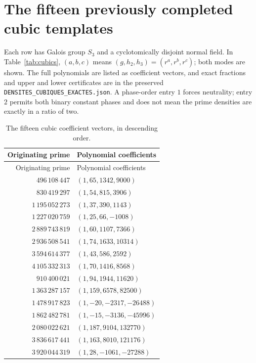 \documentclass[11pt]{article}
\theoremstyle{definition}\newtheorem{definition}[theorem]{Definition}
\begin{document}
\clearpage
\section{The fifteen previously completed cubic templates}\label{app:cubics}
Each row has Galois group $S_3$ and a cyclotomically disjoint
normal field. In Table~\ref{tab:cubics}, $(a,b,c)$ means
$(g,h_2,h_3)=(r^a,r^b,r^c)$; both modes are shown. The full
polynomials are listed as coefficient vectors, and exact fractions
and upper and lower certificates are in the preserved
\texttt{DENSITES\_CUBIQUES\_EXACTES.json}. A phase-order entry
$1$ forces neutrality; entry $2$ permits both binary constant
phases and does not mean the prime densities are exactly in a
ratio of two.
\begin{center}\small\setlength{\tabcolsep}{4pt}
\begin{longtable}{rl}
\caption{The fifteen cubic coefficient vectors, in descending order.}\label{tab:cubicpoly}\\
\toprule
Originating prime & Polynomial coefficients \\
\midrule\endfirsthead
\toprule
Originating prime & Polynomial coefficients \\
\midrule\endhead
$496\,108\,447$ & $(1,65,1342,9000)$ \\
$830\,419\,297$ & $(1,54,815,3906)$ \\
$1\,195\,052\,273$ & $(1,37,390,1143)$ \\
$1\,227\,020\,759$ & $(1,25,66,-1008)$ \\
$2\,889\,743\,819$ & $(1,60,1107,7366)$ \\
$2\,936\,508\,541$ & $(1,74,1633,10314)$ \\
$3\,594\,614\,377$ & $(1,43,586,2592)$ \\
$4\,105\,332\,313$ & $(1,70,1416,8568)$ \\
$910\,400\,021$ & $(1,94,1944,11620)$ \\
$1\,363\,287\,157$ & $(1,159,6578,82500)$ \\
$1\,478\,917\,823$ & $(1,-20,-2317,-26488)$ \\
$1\,862\,482\,781$ & $(1,-15,-3136,-45996)$ \\
$2\,080\,022\,621$ & $(1,187,9104,132770)$ \\
$3\,836\,617\,441$ & $(1,163,8010,121176)$ \\
$3\,920\,044\,319$ & $(1,28,-1061,-27288)$ \\
\bottomrule\end{longtable}\end{center}
\end{document}
